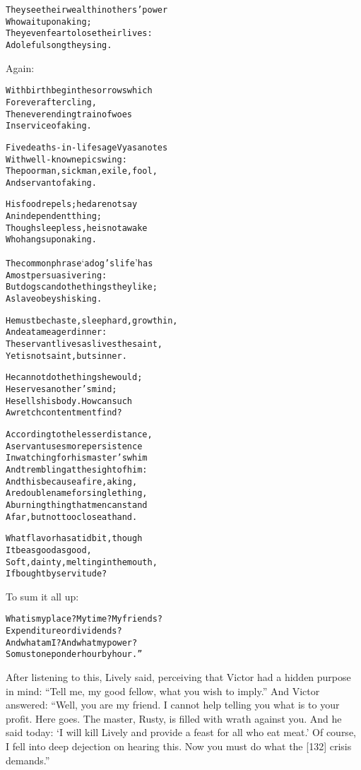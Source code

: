 \documentclass{article}
\renewenvironment{verbatim}{\begin{alltt}\normalfont\begin{centering}}{\end{centering}\end{alltt}}
\begin{document}
\begin{verbatim}
They see their wealth in others' power
    Who wait upon a king;
They even fear to lose their lives:
    A doleful song they sing.
\end{verbatim}
Again:

\begin{verbatim}
With birth begin the sorrows which
    Forever after cling,
The never ending train of woes
    In service of a king.

Five deaths-in-life sage Vyasa notes
    With well-known epic swing:
The poor man, sick man, exile, fool,
    And servant of a king.

His food repels; he dare not say
    An independent thing;
Though sleepless, he is not awake
    Who hangs upon a king.

The common phrase ‘a dog's life’ has
    A most persuasive ring:
But dogs can do the things they like;
    A slave obeys his king.

He must be chaste, sleep hard, grow thin,
    And eat a meager dinner:
The servant lives as lives the saint,
    Yet is not saint, but sinner.

He cannot do the things he would;
    He serves another's mind;
He sells his body. How can such
    A wretch contentment find?

According to the lesser distance,
A servant uses more persistence
In watching for his master's whim
And trembling at the sight of him:
And this because a fire, a king,
Are double name for single thing,
A burning thing that men can stand
Afar, but not too close at hand.

What flavor has a tidbit, though
    It be as good as good,
Soft, dainty, melting in the mouth,
    If bought by servitude?
\end{verbatim}
To sum it all up:

\begin{verbatim}
What is my place? My time? My friends?
Expenditure or dividends?
And what am I? And what my power?
So must one ponder hour by hour.”
\end{verbatim}
After listening to this, Lively said, perceiving that Victor had a
hidden purpose in mind:
``Tell me, my good fellow, what you wish to imply.'' And Victor
answered:
``Well, you are my friend. I cannot help telling you what is to your profit. Here goes. The master, Rusty, is filled with wrath against you. And he said today: `I will kill Lively and provide a feast for all who eat meat.' Of course, I fell into deep dejection on hearing this. Now you must do what the [132] crisis demands.''
\end{document}
